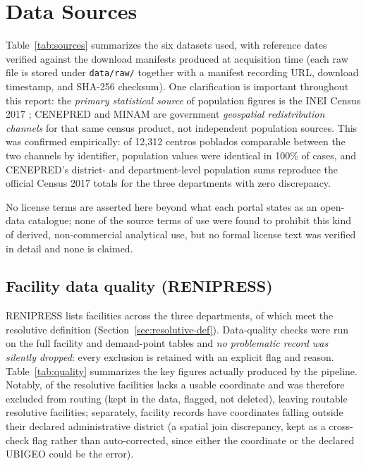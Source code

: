 \section{Data Sources}
\label{sec:data}

Table~\ref{tab:sources} summarizes the six datasets used, with reference dates verified against the download manifests produced at acquisition time (each raw file is stored under \texttt{data/raw/} together with a manifest recording URL, download timestamp, and SHA-256 checksum). One clarification is important throughout this report: the \emph{primary statistical source} of population figures is the INEI Census 2017 \citep{inei2018censo}; CENEPRED \citep{cenepred2026sigrid} and MINAM \citep{minam2026geoservidor} are government \emph{geospatial redistribution channels} for that same census product, not independent population sources. This was confirmed empirically: of 12{,}312 centros poblados comparable between the two channels by identifier, population values were identical in 100\% of cases, and CENEPRED's district- and department-level population sums reproduce the official Census 2017 totals for the three departments with zero discrepancy.

\begin{table}[htb]
\centering
\caption{Data sources used in this analysis.}
\label{tab:sources}
\small

\end{table}

No license terms are asserted here beyond what each portal states as an open-data catalogue; none of the source terms of use were found to prohibit this kind of derived, non-commercial analytical use, but no formal license text was verified in detail and none is claimed.

\subsection{Facility data quality (RENIPRESS)}

RENIPRESS lists \NFacilitiesTotal{} facilities across the three departments, of which \NResolutive{} meet the resolutive definition (Section~\ref{sec:resolutive-def}). Data-quality checks were run on the full facility and demand-point tables and \emph{no problematic record was silently dropped}: every exclusion is retained with an explicit flag and reason. Table~\ref{tab:quality} summarizes the key figures actually produced by the pipeline. Notably, \NResolutiveMissingCoords{} of the \NResolutive{} resolutive facilities lacks a usable coordinate and was therefore excluded from routing (kept in the data, flagged, not deleted), leaving \NResolutiveRoutable{} routable resolutive facilities; separately, \NDistrictMismatch{} facility records have coordinates falling outside their declared administrative district (a spatial join discrepancy, kept as a cross-check flag rather than auto-corrected, since either the coordinate or the declared UBIGEO could be the error).

\begin{table}[htb]
\centering
\caption{Key data-quality figures (facilities, routing, and population frame).}
\label{tab:quality}
\small

\end{table}
